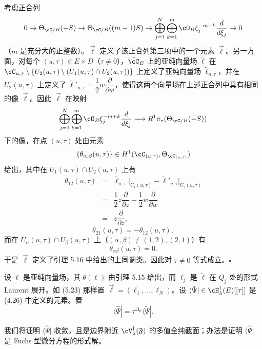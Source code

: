 考虑正合列
\[
0\to\Theta_{\cC/B}(-S)\to\Theta_{\cC/B}((m-1)S)\to
\bigoplus_{j=1}^{N}\bigoplus_{k=1}^{m}\cO_B\xi_j^{-m+k}\frac{d}{d\xi_j}\to 0
\]
（$m$ 是充分大的正整数）。$\vec\ell$ 定义了该正合列第三项中的一个元素 $\vec\ell$。另一方面，对每个 $(u,\tau)\in E\times D$（$\tau\ne0$），$\tilde{\cC}_E$ 上的亚纯向量场 $\tilde\ell$ 在 $\cC_{u,\tau}\setminus\{U_2(u,\tau)\setminus(U_1(u,\tau)\cap U_2(u,\tau))\}$ 上定义了亚纯向量场 $\tilde\ell_{u,\tau}$，并在 $U_2(u,\tau)$ 上定义了 $\tilde\ell'_{u,\tau}=\dfrac12 w\dfrac{\partial}{\partial w}$，使得这两个向量场在上述正合列中具有相同的像 $\vec\ell$。因此 $\vec\ell$ 在映射
\[
\bigoplus_{j=1}^{N}\bigoplus_{k=1}^{m}\cO_B\xi_j^{-m+k}\frac{d}{d\xi_j}
\longrightarrow R^1\pi_*(\Theta_{\cC/B}(-S))
\]
下的像，在点 $(u,\tau)$ 处由元素
\[
\{\theta_{\alpha,\beta}(u,\tau)\}\in H^1(\cC_{(u,\tau)},\Theta_{\cC_{(u,\tau)}})
\]
给出，其中在 $U_1(u,\tau)\cap U_2(u,\tau)$ 上有
\[
\begin{array}{rcl}
\theta_{12}(u,\tau) & = & \tilde\ell_{u,\tau}\big|_{U_1(u,\tau)}
   -\tilde\ell'_{u,\tau}\big|_{U_2(u,\tau)}\\[6pt]
 & = & \dfrac12 z\dfrac{\partial}{\partial z}-\dfrac12 w\dfrac{\partial}{\partial w}\\[6pt]
 & = & z\dfrac{\partial}{\partial z},
\end{array}
\]
\[
\theta_{21}(u,\tau)=-\theta_{12}(u,\tau),
\]
而在 $U_\alpha(u,\tau)\cap U_\beta(u,\tau)$ 上（$(\alpha,\beta)\ne(1,2),(2,1)$）有
\[
\theta_{\alpha\beta}(u,\tau)=0.
\]
于是 $\vec\ell$ 定义了引理 5.16 中给出的上同调类。因此对 $\tau\ne0$ 等式成立。\hfill$\square$

设 $\ell$ 是亚纯向量场，其 $\theta(\ell)$ 由引理 5.15 给出，而 $\ell_j$ 是 $\tilde\ell$ 在 $Q_j$ 处的形式 Laurent 展开。如 (5.23) 那样置 $\vec\ell=(\ell_1,\dots,\ell_N)$。设 $\langle\tilde\Psi|\in\cH^\dagger_\lambda(E)[[\tau]]$ 是 (4.26) 中定义的元素。置
\[
\langle\hat\Psi|=\tau^{\Delta_\mu}\langle\tilde\Psi|.
\]



我们将证明 $\langle\hat\Psi|$ 收敛，且是边界附近 $\cV^\dagger_\lambda(\mathfrak{F})$ 的多值全纯截面；办法是证明 $\langle\hat\Psi|$ 是 Fuchs 型微分方程的形式解。

